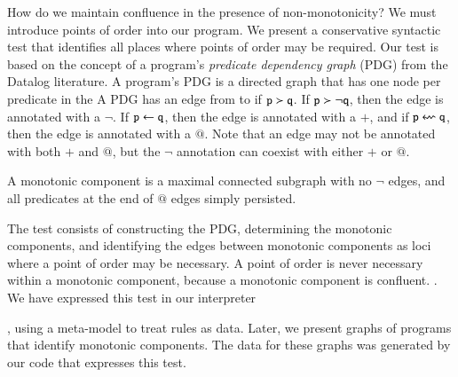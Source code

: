 How do we maintain confluence in the presence of non-monotonicity?  We must
introduce points of order into our program.  We present a conservative
syntactic test that identifies all places where points of order may be
required.  Our test is based on the concept of a program's {\em predicate
dependency graph} (PDG) from the Datalog literature.  A \lang program's PDG is
a directed graph that has one node per predicate in the A PDG has an edge from
 to  if $\dedalus{p} \succ \dedalus{q}$.  If $\dedalus{p}
\succ \lnot\dedalus{q}$, then the edge is annotated with a $\lnot$.  If
$\dedalus{p} \gets \dedalus{q}$, then the edge is annotated with a $+$, and if
$\dedalus{p} \leftsquigarrow \dedalus{q}$, then the edge is annotated with a
$@$.  Note that an edge may not be annotated with both $+$ and $@$, but the
$\lnot$ annotation can coexist with either $+$ or $@$.

\begin{definition}
%
A monotonic component is a maximal connected subgraph with no $\lnot$ edges,
and all predicates at the end of $@$ edges simply persisted.
%
\end{definition}

The test consists of constructing the PDG, determining the monotonic
components, and identifying the edges between monotonic components as loci
where a point of order may be necessary.  A point of order is never necessary
within a monotonic component, because a monotonic component is confluent.
.  We have expressed this test in our \lang 
interpreter

, using a meta-model to treat rules as data.  Later, we present graphs of programs that
identify monotonic components.  The data for these graphs was generated by our
\lang code that expresses this test.
